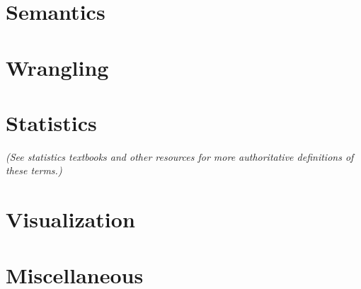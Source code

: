 \begin{appendices}
\section{Semantics}


\section{Wrangling}


\section{Statistics}
\emph{(See statistics textbooks and other resources for more authoritative definitions of these terms.)}


\section{Visualization}


% 

% 

\section{Miscellaneous}


\end{appendices}
